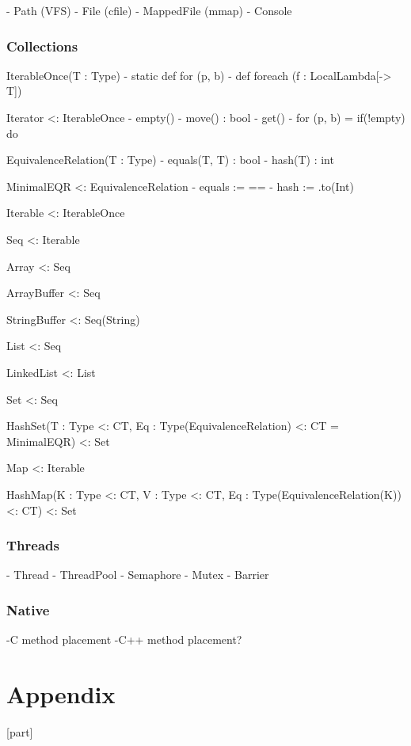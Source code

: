 \documentclass[a4paper,10pt]{article}
\begin{document}
 - Path (VFS)
 - File (cfile)
 - MappedFile (mmap)
 - Console


\section{Collections}

IterableOnce(T : Type)
- static def for (p, b)
- def foreach (f : LocalLambda[-> T])

Iterator <: IterableOnce
- empty()
- move() : bool
- get()
- for (p, b) = if(!empty) do {}

EquivalenceRelation(T : Type)
- equals(T, T) : bool
- hash(T) : int

MinimalEQR <: EquivalenceRelation
- equals := ==
- hash := .to(Int)

Iterable <: IterableOnce

Seq <: Iterable

Array <: Seq

ArrayBuffer <: Seq

StringBuffer <: Seq(String)

List <: Seq

LinkedList <: List

Set <: Seq

HashSet(T : Type <: CT, Eq : Type(EquivalenceRelation) <: CT = MinimalEQR) <: Set

Map <: Iterable

HashMap(K : Type <: CT, V : Type <: CT, Eq : Type(EquivalenceRelation(K)) <: CT) <: Set

\section{Threads}

- Thread
- ThreadPool
- Semaphore
- Mutex
- Barrier

\section{Native}

-C method placement
-C++ method placement?



\newpage
\part{Appendix}
[part]
\renewcommand{\thesection}{\Alph{myc}}
\let\osection\section
\renewenvironment{section}{\stepcounter{myc}\osection}

\newpage
\printglossaries

\small{
    
    
}

\todos
\end{document}
